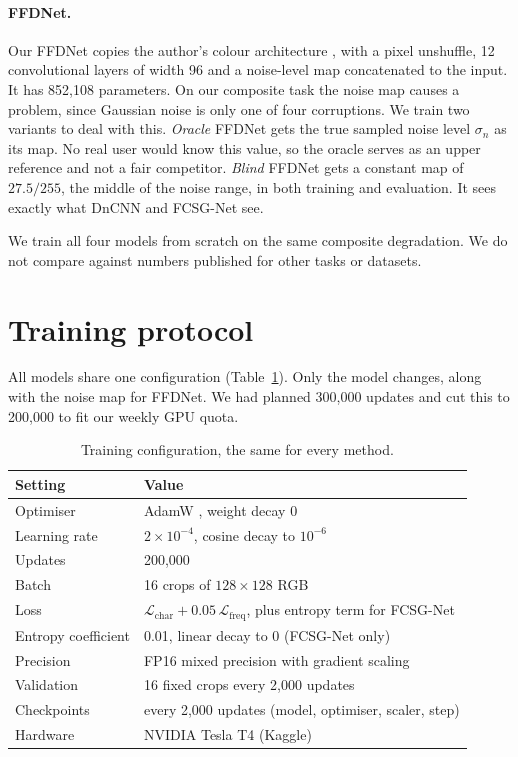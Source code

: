 \documentclass[12pt,a4paper,oneside]{NITR}
\newcommand{\fcsg}{FCSG-Net}
\begin{document}
\paragraph{FFDNet.} Our FFDNet copies the author's colour architecture
\cite{kair}, with a pixel unshuffle, 12 convolutional layers of width 96 and a
noise-level map concatenated to the input. It has 852,108 parameters. On our
composite task the noise map causes a problem, since Gaussian noise is only
one of four corruptions. We train two variants to deal with this.
\emph{Oracle} FFDNet gets the true sampled noise level $\sigma_n$ as its map.
No real user would know this value, so the oracle serves as an upper
reference and not a fair competitor. \emph{Blind} FFDNet gets a constant map
of $27.5/255$, the middle of the noise range, in both training and
evaluation. It sees exactly what DnCNN and \fcsg{} see.

We train all four models from scratch on the same composite degradation. We
do not compare against numbers published for other tasks or datasets.

\section{Training protocol}\label{sec:training}

All models share one configuration (Table~\ref{tab:hparams}). Only the model
changes, along with the noise map for FFDNet. We had planned 300,000 updates
and cut this to 200,000 to fit our weekly GPU quota.

\begin{table}[htbp]
	\centering
	\caption{Training configuration, the same for every method.}
	\label{tab:hparams}
	\small
	\begin{tabular}{@{}ll@{}}
		\toprule
		Setting & Value \\
		\midrule
		Optimiser            & AdamW \cite{loshchilov2019adamw}, weight decay 0 \\
		Learning rate        & $2\times10^{-4}$, cosine decay \cite{loshchilov2017sgdr} to $10^{-6}$ \\
		Updates              & 200,000 \\
		Batch                & 16 crops of $128\times128$ RGB \\
		Loss                 & $\mathcal{L}_\text{char} + 0.05\,\mathcal{L}_\text{freq}$, plus entropy term for \fcsg{} \\
		Entropy coefficient  & 0.01, linear decay to 0 (\fcsg{} only) \\
		Precision            & FP16 mixed precision \cite{micikevicius2018amp} with gradient scaling \\
		Validation           & 16 fixed crops every 2,000 updates \\
		Checkpoints          & every 2,000 updates (model, optimiser, scaler, step) \\
		Hardware             & NVIDIA Tesla T4 (Kaggle) \\
		\bottomrule
	\end{tabular}
\end{table}
\end{document}
